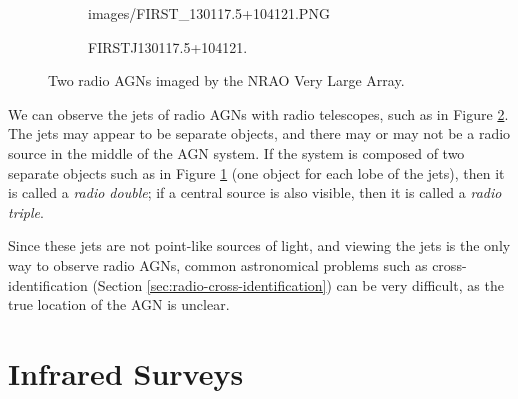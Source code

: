 \begin{figure}
\begin{subfigure}{0.4\textwidth}
                    {images/FIRST_130117.5+104121.PNG}
                \caption{FIRSTJ130117.5+104121.}
                \label{fig:first-double}
            \end{subfigure}%
            \caption{Two radio AGNs imaged by the NRAO Very Large Array.}
            \label{fig:first-agn}
        \end{figure}

        We can observe the jets of radio AGNs with radio telescopes, such as in
        Figure \ref{fig:first-agn}. The jets may appear to be separate objects,
        and there may or may not be a radio source in the middle of the AGN
        system. If the system is composed of two separate objects such as in
        Figure \ref{fig:first-double} (one object for each lobe of the jets),
        then it is called a \emph{radio double}; if a central source is also
        visible, then it is called a \emph{radio triple}.

        Since these jets are not point-like sources
        of light, and viewing the jets is the only way to observe radio AGNs,
        common astronomical problems such as cross-identification (Section
        \ref{sec:radio-cross-identification}) can be very difficult, as the true
        location of the AGN is unclear.



    \section{Infrared Surveys}
    \label{sec:infrared-surveys}

